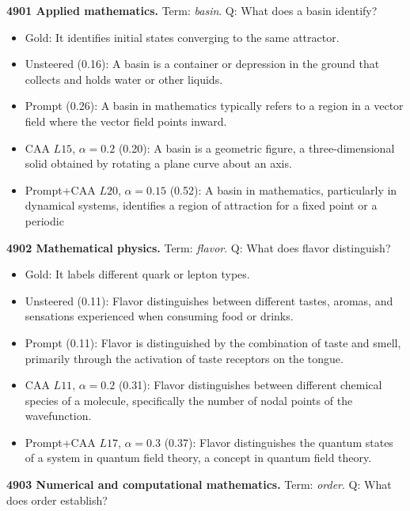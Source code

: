 \medskip\noindent\textbf{4901 Applied mathematics.} Term: \emph{basin}.
Q: What does a basin identify?
\begin{itemize}\setlength{\itemsep}{0.15em}\setlength{\parsep}{0pt}\setlength{\topsep}{0.2em}
\item Gold: It identifies initial states converging to the same attractor.
\item Unsteered (0.16): A basin is a container or depression in the ground that collects and holds water or other liquids.
\item Prompt (0.26): A basin in mathematics typically refers to a region in a vector field where the vector field points inward.
\item CAA $L15$, $\alpha=0.2$ (0.20): A basin is a geometric figure, a three-dimensional solid obtained by rotating a plane curve about an axis.
\item Prompt+CAA $L20$, $\alpha=0.15$ (0.52): A basin in mathematics, particularly in dynamical systems, identifies a region of attraction for a fixed point or a periodic
\end{itemize}
\medskip\noindent\textbf{4902 Mathematical physics.} Term: \emph{flavor}.
Q: What does flavor distinguish?
\begin{itemize}\setlength{\itemsep}{0.15em}\setlength{\parsep}{0pt}\setlength{\topsep}{0.2em}
\item Gold: It labels different quark or lepton types.
\item Unsteered (0.11): Flavor distinguishes between different tastes, aromas, and sensations experienced when consuming food or drinks.
\item Prompt (0.11): Flavor is distinguished by the combination of taste and smell, primarily through the activation of taste receptors on the tongue.
\item CAA $L11$, $\alpha=0.2$ (0.31): Flavor distinguishes between different chemical species of a molecule, specifically the number of nodal points of the wavefunction.
\item Prompt+CAA $L17$, $\alpha=0.3$ (0.37): Flavor distinguishes the quantum states of a system in quantum field theory, a concept in quantum field theory.
\end{itemize}
\medskip\noindent\textbf{4903 Numerical and computational mathematics.} Term: \emph{order}.
Q: What does order establish?
